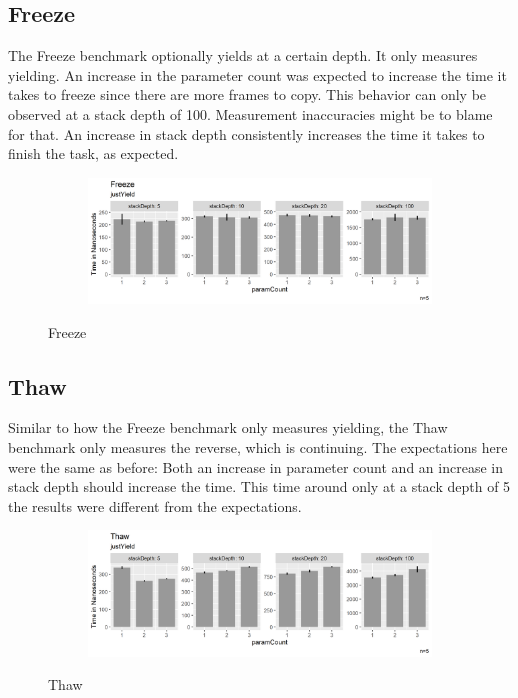\subsection{Freeze}
The Freeze benchmark optionally yields at a certain depth. It only measures yielding. An increase in the parameter count was expected to increase the time it takes to freeze since there are more frames to copy. This behavior can only be observed at a stack depth of 100. Measurement inaccuracies might be to blame for that. An increase in stack depth consistently increases the time it takes to finish the task, as expected.

\begin{figure}[H]
  \centering
  \begin{subfigure}[b]{1.0\textwidth}
    \includegraphics[width=1.0\linewidth]{img/jmh/Freeze.png}
  \end{subfigure}
  \caption{Freeze}
\end{figure}


\subsection{Thaw}
Similar to how the Freeze benchmark only measures yielding, the Thaw benchmark only measures the reverse, which is continuing. The expectations here were the same as before: Both an increase in parameter count and an increase in stack depth should increase the time. This time around only at a stack depth of 5 the results were different from the expectations.

\begin{figure}[H]
  \centering
  \begin{subfigure}[b]{1.0\textwidth}
    \includegraphics[width=1.0\linewidth]{img/jmh/Thaw.png}
  \end{subfigure}
  \caption{Thaw}
\end{figure}

